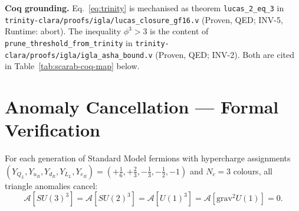 \noindent\textbf{Coq grounding.}
Eq.~\eqref{eq:trinity} is mechanised as theorem \texttt{lucas\_2\_eq\_3}
in \texttt{trinity-clara/proofs/igla/lucas\_closure\_gf16.v} (Proven, QED;
INV-5, Runtime: abort).
The inequality $\phi^3 > 3$ is the content of
\texttt{prune\_threshold\_from\_trinity} in
\texttt{trinity-clara/proofs/igla/igla\_asha\_bound.v} (Proven, QED; INV-2).
Both are cited in Table~\ref{tab:scarab-coq-map} below.

\section{Anomaly Cancellation — Formal Verification}
\label{sec:scarab-anomaly}

\begin{theorem}
\label{thm:scarab-anomaly}
For each generation of Standard Model fermions with hypercharge
assignments $(Y_{Q_L}, Y_{u_R}, Y_{d_R}, Y_{L_L}, Y_{e_R})
= (+\tfrac{1}{6}, +\tfrac{2}{3}, -\tfrac{1}{3}, -\tfrac{1}{2}, -1)$
and $N_c = 3$ colours, all triangle anomalies cancel:
\begin{equation}
  \mathcal{A}[SU(3)^3] = \mathcal{A}[SU(2)^3] = \mathcal{A}[U(1)^3]
  = \mathcal{A}[\mathrm{grav}^2 U(1)] = 0.
\end{equation}
\end{theorem}

